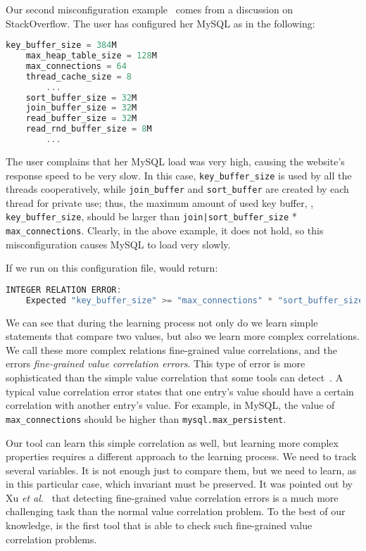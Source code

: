 Our second misconfiguration example~\cite{correlation} 
comes from a discussion on StackOverflow.
The user has configured her MySQL as in the following:

\begin{lstlisting}[language=C, xleftmargin=.01\textwidth]
    key_buffer_size = 384M
    max_heap_table_size = 128M
    max_connections = 64
    thread_cache_size = 8
        ...
    sort_buffer_size = 32M
    join_buffer_size = 32M
    read_buffer_size = 32M
    read_rnd_buffer_size = 8M
        ...
\end{lstlisting} 

The user complains that her MySQL load was very high, 
causing the website's
response speed to be very slow.
In this case, {\tt key\_buffer\_size} is used by all the threads
cooperatively, while {\tt join\_buffer} and {\tt sort\_buffer} are 
created by each thread for private use; thus, the maximum amount
of used key buffer, \ie, {\tt key\_buffer\_size}, should be larger than 
{\tt join|sort\_buffer\_size} * {\tt max\_connections}. 
Clearly, in the above example, it does not hold, 
so this misconfiguration causes MySQL to load very slowly.

If we run \app on this configuration file, \app  would return:

\begin{lstlisting}[language=C, xleftmargin=.01\textwidth]
    INTEGER RELATION ERROR:
    Expected "key_buffer_size" >= "max_connections" * "sort_buffer_size"
\end{lstlisting} 

We can see that during the learning process not only do we learn simple statements that compare two values, 
but also we learn more complex correlations. We call these more complex relations fine-grained value correlations, and the errors
\emph{fine-grained value correlation errors}. 
This type of error is more sophisticated than the simple value correlation that some tools can detect~\cite{yin11anempirical, zhang14encore}.
A typical value correlation error
states that one entry's value should have a certain correlation with
another entry's value. For example, in MySQL,
the value of {\tt max\_connections} should be higher than
{\tt mysql.max\_persistent}. 

Our tool can learn this simple correlation as well, but learning more complex properties requires a different 
approach to the learning 
process. We need to track several variables. It is not enough just to compare them, but we need to learn, as in this particular case, which
invariant must be preserved. It was pointed out by Xu {\em et al.}~\cite{xu15hey} that
detecting fine-grained value correlation errors 
is a much more challenging
task than the normal value correlation problem.
To the best of our knowledge, \app is the first tool that
is able to check such fine-grained value correlation problems.

